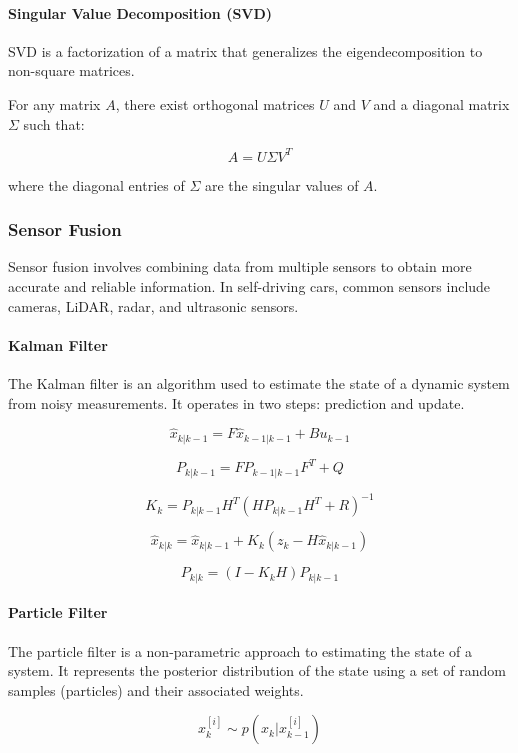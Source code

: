 \documentclass[12pt]{article}
\begin{document}
\paragraph{Singular Value Decomposition (SVD)}

SVD is a factorization of a matrix that generalizes the eigendecomposition to non-square matrices.

For any matrix \( A \), there exist orthogonal matrices \( U \) and \( V \) and a diagonal matrix \( \Sigma \) such that:

\[
A = U \Sigma V^T
\]

where the diagonal entries of \( \Sigma \) are the singular values of \( A \).

\subsubsection{Sensor Fusion}

Sensor fusion involves combining data from multiple sensors to obtain more accurate and reliable information. In self-driving cars, common sensors include cameras, LiDAR, radar, and ultrasonic sensors.

\paragraph{Kalman Filter}

The Kalman filter is an algorithm used to estimate the state of a dynamic system from noisy measurements. It operates in two steps: prediction and update.

\[
\hat{x}_{k|k-1} = F \hat{x}_{k-1|k-1} + B u_{k-1}
\]

\[
P_{k|k-1} = F P_{k-1|k-1} F^T + Q
\]

\[
K_k = P_{k|k-1} H^T (H P_{k|k-1} H^T + R)^{-1}
\]

\[
\hat{x}_{k|k} = \hat{x}_{k|k-1} + K_k (z_k - H \hat{x}_{k|k-1})
\]

\[
P_{k|k} = (I - K_k H) P_{k|k-1}
\]

\paragraph{Particle Filter}

The particle filter is a non-parametric approach to estimating the state of a system. It represents the posterior distribution of the state using a set of random samples (particles) and their associated weights.

\[
x_k^{[i]} \sim p(x_k | x_{k-1}^{[i]})
\]
\end{document}
